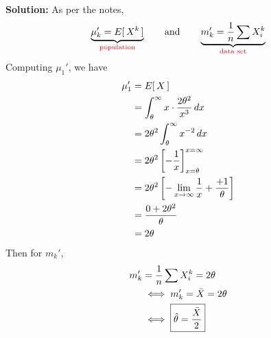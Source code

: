 \textbf{Solution: } As per the notes,
$$\underbrace{\mu_k' =E[\,X^k\,]}_{\text{\color{red}population}} \qquad \text{and} \qquad \underbrace{m_k' = \over{n}\sum X_i^k}_{\text{\color{red}data set}}$$
Computing $\mu_1'$, we have
\begin{align*}
    \mu_1' &= \Eb{X}\\
    &= \int_{\theta}^{\infty} x \cdot \frac{2\theta^2}{x^3} \,dx\\
    &= 2\theta^2 \int_{\theta}^{\infty} x^{-2}\,dx\\
    &= 2\theta^2 \brac{-\frac{1}{x}}_{x=\theta}^{x=\infty}\\
    &= 2\theta^2 \brac{- \limx \over{x} + \frac{+1}{\theta}}\\
    &= \frac{0 + 2\theta^2}{\theta}\\
    &= 2\theta
\end{align*}
Then for $m_k'$,
\begin{align*}
    m_k' &= \over{n}\sum X_i^k = 2\theta\\
    &\iff m_k' = \xbar = 2\theta\\
    &\iff \boxed{\that = \frac{\xbar}{2}}
\end{align*}
